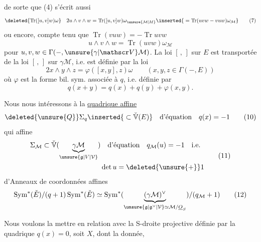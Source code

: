 de sorte que (4) s'écrit aussi
\[
\deleted{\operatorname{Tr}([u,v]w)\omega}\quad 2u\wedge v\wedge w=\operatorname{Tr}([u,v]w)\omega_{\unsure{\mathcal M|M}}\inserted{{}=\operatorname{Tr}(uvw-vuw)\omega_{\mathcal M}}\tag*{(7)}
\]
 ou encore, compte tenu que $\operatorname{Tr}(vuw)=-\operatorname{Tr}uvw$
\[
u\wedge v\wedge w=\operatorname{Tr}(uvw)\omega_{\mathcal M}\tag*{(8)}
\]
pour $u,v,w\in\Gamma(-,\unsure{\gamma|\mathscr V}\mathcal M)$. La loi $[\, ,\, ]$ sur $E$ est transportée de la loi $[\, ,\, ]$ sur $\gamma\mathcal M$, i.e. est définie par la loi
\[
2x\wedge y\wedge z=\varphi([x,y],z)\omega\qquad(x,y,z\in\Gamma(-,E))\tag*{(8)}
\]
où $\varphi$ est la forme bil. sym. associée à $q$, i.e. définie par
\[
q(x+y)=q(x)+q(y)+\varphi(x,y).\tag*{(9)}
\]

Nous nous intéressons à la \uline{quadrique affine}
\[
\deleted{\unsure{Q}}\Sigma_q\inserted{{}\subset\check{\mathbb V}(E)}\quad\text{d'équation}\quad q(x)=-1\tag*{(10)}
\]
qui   affine
\[
\begin{aligned}\Sigma_{\mathcal M}\subset\check{\mathbb V}(\underbrace{\gamma\mathcal M}_{\unsure{\mathfrak g|V|\mathcal V}})&\quad\text{d'équation}\quad q_{\mathcal M}(u)=-1\quad\text{i.e.}\\&\det u=\deleted{\unsure{+}}1\end{aligned}\tag*{(11)}
\]
d'Anneaux de coordonnées affines
\[
\operatorname{Sym}^{*}(\check E)/(q+1)\operatorname{Sym}^{*}(\check E)\simeq\operatorname{Sym}^{*}(\underbrace{(\gamma\mathcal M)^\vee}_{\unsure{\mathfrak g|\mathfrak g^\vee|\mathcal V}\simeq\mathcal M/\underline O_S})/(q_{\mathcal M}+1)\tag*{(12)}
\]

Nous voulons la mettre en relation avec la S-droite projective définie par la quadrique $q(x)=0$, soit  $X$,  dont la donnée,
